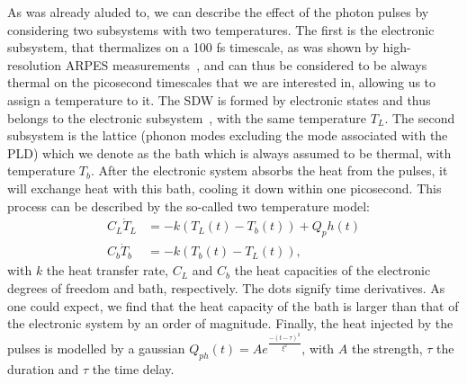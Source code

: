 
As was already aluded to, we can describe the effect of the photon pulses by considering two subsystems with two temperatures.
The first is the electronic subsystem, that thermalizes on a 100 fs timescale, as was shown by high-resolution ARPES measurements~\cite{Nicholson2016}, and can thus be considered to be always thermal on the picosecond timescales that we are interested in, allowing us to assign a temperature to it.
The SDW is formed by electronic states and thus belongs to the electronic subsystem~\cite{Nicholson2016}, with the same temperature $T_L$.
The second subsystem is the lattice (phonon modes excluding the mode associated with the PLD) which we denote as the bath which is always assumed to be thermal, with temperature $T_b$.
After the electronic system absorbs the heat from the pulses, it will exchange heat with this bath, cooling it down within one picosecond.
This process can be described by the so-called two temperature model:
\begin{align}
	\label{eq:Cr_twotemp}
	C_L \dot{T}_L &= -k(T_L(t) - T_b(t)) + Q_ph(t) \\
	C_b \dot{T}_b &= -k(T_b(t) - T_L(t)),\nonumber
\end{align}
with $k$ the heat transfer rate, $C_L$ and $C_b$ the heat capacities of the electronic degrees of freedom and bath, respectively.
The dots signify time derivatives.
As one could expect, we find that the heat capacity of the bath is larger than that of the electronic system by an order of magnitude.
Finally, the heat injected by the pulses is modelled by a gaussian $Q_{ph}(t) = A e^{\frac{-(t - \tau)^2}{\xi^2}}$, with $A$ the strength, $\tau$ the duration and $\tau$ the time delay.

